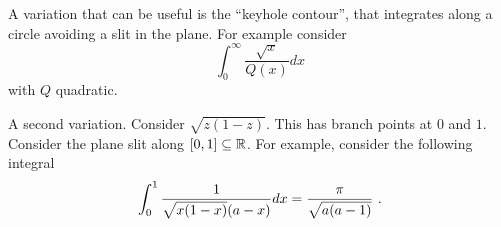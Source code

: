 A variation that can be useful is the ``keyhole contour'', that integrates along a circle avoiding a slit in the plane.
For example consider
\[
\int_0^\infty \frac{\sqrt{x}}{Q(x)} dx
\]
with $Q$ quadratic.

A second variation. Consider $\sqrt{z(1 - z)}$. This has branch points at $0$ and $1$. Consider the plane slit along $[0, 1] \subseteq \mathbb{R}$. For example, consider the following integral
\[
\int_0^1 \frac{1}{\sqrt{x(1-x)}(a-x)} dx = \frac{\pi}{\sqrt{a (a-1)}} \ \text{.}
\]

